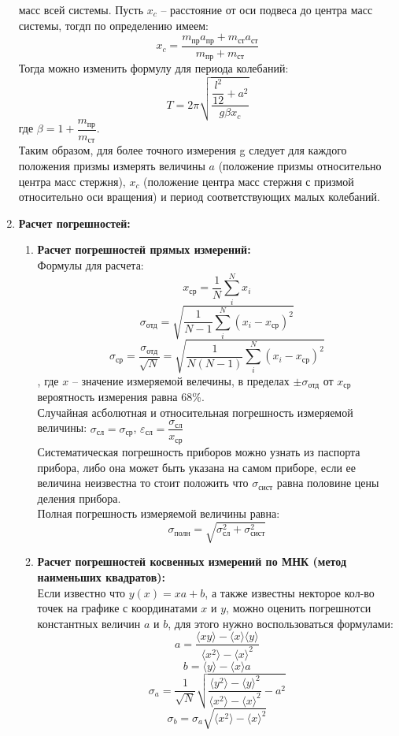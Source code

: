 \documentclass[a4paper, 12pt]{article}
\begin{document}
\begin{enumerate}
масс всей системы. Пусть $x_c$ -- расстояние от оси подвеса до центра масс системы, тогдп по определению имеем:
\[x_c = \dfrac{m_{\text{пр}}a_{\text{пр}} + m_{\text{ст}}a_{\text{ст}}}{m_{\text{пр}} + m_{\text{ст}}}\]
Тогда можно изменить формулу для периода колебаний:
\[T = 2\pi\sqrt{\dfrac{\dfrac{l^2}{12} + a^2}{g\beta x_c}}\]
где $\beta = 1 + \dfrac{m_{\text{пр}}}{m_{\text{ст}}}$.\\
Таким образом, для более точного измерения g следует для каждого положения призмы измерять величины $a$ (положение призмы относительно
центра масс стержня), $x_c$ (положение центра масс стержня с призмой относительно оси вращения) и период соответствующих малых колебаний.
\item \textbf{Расчет погрешностей:}
\begin{enumerate}
\item \textbf{Расчет погрешностей прямых измерений:}\\
Формулы для расчета:
\[x_{\text{ср}} = \frac{1}{N} \sum_i^N x_i\]
\[\sigma_{\text{отд}} = \sqrt{\dfrac{1}{N-1}\sum_i^N(x_i - x_{\text{ср}})^2} \]
\[\sigma_{\text{ср}} = \dfrac{\sigma_{\text{отд}}}{\sqrt{N}} = \sqrt{\dfrac{1}{N(N-1)}\sum_i^N(x_i - x_{\text{ср}})^2}\]
, где $x$ -- значение измеряемой велечины, в пределах $\pm\sigma_{\text{отд}}$  от $x_{\text{ср}}$ вероятность измерения равна 68\%.\\
Случайная асболютная и относительная погрешность измеряемой величины:
$\sigma_{\text{сл}} = \sigma_{\text{ср}}$, $\varepsilon_{\text{сл}} =
\dfrac{\sigma_{\text{сл}}}{x_{\text{ср}}}$\\
Систематическая погрешность приборов можно узнать из паспорта прибора, либо она может быть указана на самом приборе, если ее величина неизвестна то стоит положить что $\sigma_{\text{сист}}$ равна половине цены деления прибора.\\
Полная погрешность измеряемой величины равна:
\[\sigma_{\text{полн}} = \sqrt{\sigma_{\text{сл}}^2 + \sigma_{\text{сист}}^2}\]
\item \textbf{Расчет погрешностей косвенных измерений по МНК (метод наименьших квадратов):}\\
Если известно что $y(x) = xa+b$, а также известны некторое кол-во точек на графике с координатами $x$ и $y$, можно оценить погрешнотси константных величин $a$ и $b$, для этого нужно воспользоваться формулами:
\[ a = \dfrac{\langle xy\rangle - \langle x\rangle \langle y\rangle}{\langle x^2\rangle - \langle x\rangle ^2}\]
\[b = \langle y\rangle - \langle x\rangle a\]
\[\sigma_a = \frac{1}{\sqrt{N}}\sqrt{\dfrac{\langle y^2\rangle - \langle y \rangle ^2}{\langle x^2\rangle - \langle x\rangle ^2} - a^2}\]
\[\sigma_b = \sigma_a\sqrt{\langle x^2\rangle - \langle x\rangle ^2}\]
\end{enumerate}
\end{enumerate}
\end{document}
